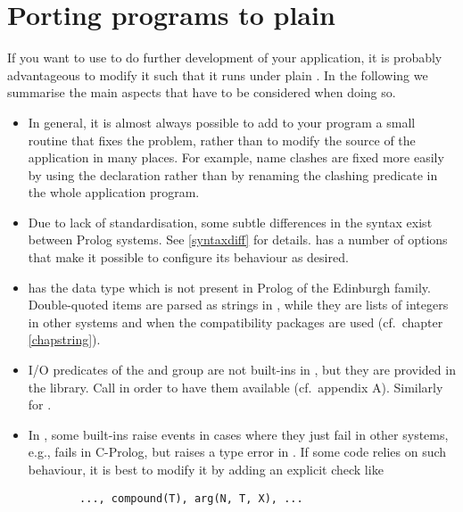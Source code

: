 \section{Porting programs to plain {\eclipse}}
If you want to use {\eclipse} to do further development of your application,
it is probably advantageous to modify it such that it runs under plain
{\eclipse}.
In the following we summarise the main aspects that have to be considered
when doing so.

\begin{itemize}
\item
In general, it is almost always possible to add to your program
a small routine that fixes the problem, rather than to modify
the source of the application in many places.
For example, name clashes are fixed more easily
by using the  declaration
rather than by renaming
the clashing predicate in the whole application program.

\item
Due to lack of standardisation, some subtle differences in the
syntax exist between Prolog systems. See \ref{syntaxdiff}
for details. {\eclipse} has a number of options that make it possible
to configure its behaviour as desired.

\item
{\eclipse} has the  data type which is not present in Prolog
of the Edinburgh family.
Double-quoted items are parsed as strings in {\eclipse}, while they are
lists of integers in other systems and when the compatibility
packages are used (cf.\ chapter \ref{chapstring}).

\item
I/O predicates of the  and  group are not built-ins
in {\eclipse}, but they are provided in the  library.
Call  in order to have them available (cf.\ appendix A).
Similarly for .

\item
In {\eclipse}, some built-ins raise events in cases where they just fail
in other systems, e.g.,  fails in C-Prolog, but
raises a type error in {\eclipse}.
If some code relies on such behaviour, it is best to modify it by
adding an explicit check like
\begin{verbatim}
        ..., compound(T), arg(N, T, X), ...
\end{verbatim}


\end{itemize}

